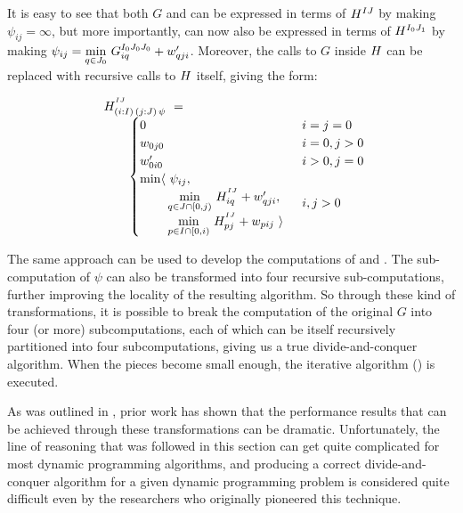 It is easy to see that both $G$ and  can be expressed in terms of $H^{IJ}$ by making $\psi_{ij}=\infty$, 
but more importantly,  can now also be expressed in terms of $H^{I_0J_1}$ by making 
$\psi_{ij} =  \underset{q\in J_0}\min ~ G^{I_0J_0J_0}_{iq} + w'_{qji}$.
Moreover, the calls to $G$ inside $H$ can be replaced with recursive calls to $H$ itself,
giving the form: 

\begin{equation}\LeftEqNo
\begin{array}{l@{}l}
	\Ggen^{^{IJ}}_{(i:I)\,(j:J)\,\psi} ~=~  \\
	\qquad
	\begin{cases}
		0                         & i=j=0 \\
		w_{0j0}                   & i=0, j>0 \\
		w'_{0i0}                  & i>0, j=0 \\
		\begin{array}{@{}l@{~}l}
		  \min\langle & \psi_{ij}, \\
		              & \!\underset{q\in J\cap[0,j)}\min ~ H^{^{IJ}}_{iq} + \yw{qji}, \\
		              & \!\underset{p\in I\cap[0,i)}\min ~ H^{^{IJ}}_{pj} + \xw{pij}~\rangle
		\end{array}              & i,j>0
	\end{cases}
\end{array}
\end{equation}

The same approach can be used to develop the computations of  and .
The sub-computation of $\psi$ can also be transformed into four recursive sub-computations, further improving the locality of the resulting algorithm.
So through these kind of transformations, it is possible to break the computation of the original $G$ into four (or more) subcomputations, each of which can be itself recursively partitioned into four subcomputations, giving us a true divide-and-conquer algorithm.
When the pieces become small enough, the iterative algorithm () is executed.

\medskip
As was outlined in , prior work has shown that the performance results that can be achieved through these transformations can be dramatic. Unfortunately, the line of reasoning that was followed in this section can get quite complicated for most dynamic programming algorithms, and producing a correct divide-and-conquer algorithm for a given dynamic programming problem is considered quite difficult even by the researchers who originally pioneered this technique. 

